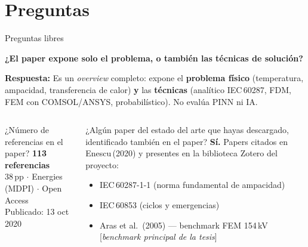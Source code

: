 \documentclass[aspectratio=169]{beamer}
\begin{document}
\section{Preguntas}

\begin{frame}{Preguntas libres}
  \begin{alertblock}{}
    \centering\large
    \textbf{¿El paper expone solo el problema,
    o también las técnicas de solución?}
  \end{alertblock}
  \smallskip
  \small
  \textbf{Respuesta:} Es un \textit{overview} completo:
  expone el \textbf{problema físico} (temperatura, ampacidad,
  transferencia de calor) \textbf{y} las \textbf{técnicas}
  (analítico IEC\,60287, FDM, FEM con COMSOL/ANSYS, probabilístico).
  No evalúa PINN ni IA.\par\medskip
  \begin{columns}[T]
      \begin{block}{¿Número de referencias en el paper?}
        \centering\Large
        \textbf{113 referencias}\\{}
        \small 38\,pp $\cdot$ Energies (MDPI) $\cdot$ Open Access\\
        Publicado: 13 oct 2020
      \end{block}
      \begin{exampleblock}{\small ¿Algún paper del estado del arte que hayas
        descargado, identificado también en el paper?}
        \small
        \textbf{Sí.} Papers citados en Enescu\,(2020) y presentes
        en la biblioteca Zotero del proyecto:
        \begin{itemize}\footnotesize
          \item IEC\,60287-1-1 (norma fundamental de ampacidad)
          \item IEC\,60853 (ciclos y emergencias)
          \item Aras et al.\ (2005) --- benchmark FEM 154\,kV\\{}
                [\textit{benchmark principal de la tesis}]
        \end{itemize}
      \end{exampleblock}
  \end{columns}
\end{frame}
\end{document}
